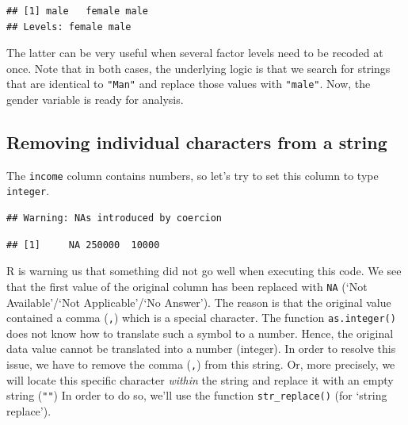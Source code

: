 \documentclass[
  12pt,
]{style/krantz}
\newenvironment{Shaded}{\begin{snugshade}}{\end{snugshade}}
\newcommand{\FunctionTok}[1]{\textcolor[rgb]{0.00,0.00,0.00}{#1}}
\newcommand{\NormalTok}[1]{#1}
\newcommand{\OtherTok}[1]{\textcolor[rgb]{0.56,0.35,0.01}{#1}}
\newcommand{\SpecialCharTok}[1]{\textcolor[rgb]{0.00,0.00,0.00}{#1}}
\newcommand{\StringTok}[1]{\textcolor[rgb]{0.31,0.60,0.02}{#1}}
\begin{document}
\begin{Shaded}
\end{Shaded}

\begin{verbatim}
## [1] male   female male  
## Levels: female male
\end{verbatim}

The latter can be very useful when several factor levels need to be recoded at once. Note that in both cases, the underlying logic is that we search for strings that are identical to \texttt{"Man"} and replace those values with \texttt{"male"}. Now, the gender variable is ready for analysis.

\hypertarget{removing-individual-characters-from-a-string}{%
\subsection{Removing individual characters from a string}\label{removing-individual-characters-from-a-string}}

The \texttt{income} column contains numbers, so let's try to set this column to type \texttt{integer}.

\begin{Shaded}
\end{Shaded}

\begin{verbatim}
## Warning: NAs introduced by coercion
\end{verbatim}

\begin{verbatim}
## [1]     NA 250000  10000
\end{verbatim}

R is warning us that something did not go well when executing this code. We see that the first value of the original column has been replaced with \texttt{NA} (`Not Available'/`Not Applicable'/`No Answer'). The reason is that the original value contained a comma (\texttt{,}) which is a special character. The function \texttt{as.integer()} does not know how to translate such a symbol to a number. Hence, the original data value cannot be translated into a number (integer). In order to resolve this issue, we have to remove the comma (\texttt{,}) from this string. Or, more precisely, we will locate this specific character \emph{within} the string and replace it with an empty string (\texttt{""}) In order to do so, we'll use the function \texttt{str\_replace()} (for `string replace').
\end{document}
